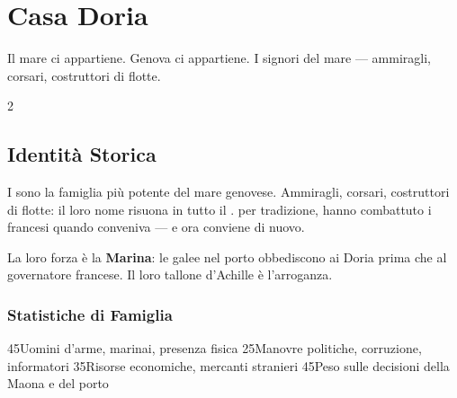 

\chapter{Casa Doria}
\label{ch:doria}


%
  {Il mare ci appartiene. Genova ci appartiene.}%
  {I signori del mare — ammiragli, corsari, costruttori di flotte.}

\begin{multicols}{2}

\section{Identità Storica}
\label{sec:doria-identita}

I  sono la famiglia più potente del mare genovese.
Ammiragli, corsari, costruttori di flotte: il loro nome risuona in tutto il
.  per tradizione, hanno combattuto i francesi
quando conveniva — e ora conviene di nuovo.

La loro forza è la \textbf{Marina}: le galee nel porto obbediscono ai Doria
prima che al governatore francese. Il loro tallone d'Achille è l'arroganza.

\columnbreak

\subsection{Statistiche di Famiglia}


     {4}{5}{Uomini d'arme, marinai, presenza fisica}
   {2}{5}{Manovre politiche, corruzione, informatori}
 {3}{5}{Risorse economiche, mercanti stranieri}
 {4}{5}{Peso sulle decisioni della Maona e del porto}

\end{multicols}

